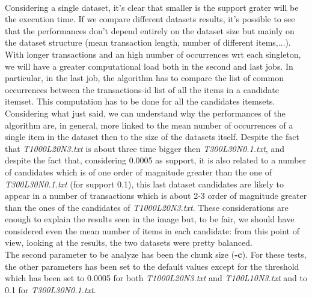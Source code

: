 \documentclass[]{report}
\begin{document}
    \vspace{-0.5cm}
    \\
   	Considering a single dataset, it's clear that smaller is the support grater will be the execution time. If we compare different datasets results, it's possible to see that the performances don't depend entirely on the dataset size but mainly on the dataset structure (mean transaction length, number of different items,...). With longer transactions and an high number of occurrences wrt each singleton, we will have a greater computational load both in the second and last jobs. In particular, in the last job, the algorithm has to compare the list of common occurrences between the transactions-id list of all the items in a candidate itemset. This computation has to be done for all the candidates itemsets. Considering what just said, we can understand why the performances of the algorithm are, in general, more linked to the mean number of occurrences of a single item in the dataset then to the size of the datasets itself.  Despite the fact that \textit{T1000L20N3.txt} is about three time bigger then  \textit{T300L30N0.1.txt}, and despite the fact that, considering 0.0005 as support, it is also related to a number of candidates which is of one order of magnitude greater than the one of \textit{T300L30N0.1.txt} (for support 0.1), this last dataset candidates are likely to appear in a number of transactions which is about 2-3 order of magnitude greater than the ones of the candidates of \textit{T1000L20N3.txt}. These considerations are enough to explain the results seen in the image but, to be fair, we should have considered even the mean number of items in each candidate: from this point of view, looking at the results, the two datasets were pretty balanced. \\
   	The second parameter to be analyze has been the chunk size (\textbf{-c}). For these tests, the other parameters has been set to the default values except for the threshold which has been set to 0.0005 for both  \textit{T1000L20N3.txt} and  \textit{T100L10N3.txt} and to 0.1 for  \textit{T300L30N0.1.txt}. 
	\begin{figure}[h]
		\centering
	\end{figure}
\end{document}
